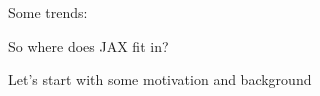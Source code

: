 \documentclass[
    xcolor={svgnames,dvipsnames},
    hyperref={colorlinks, citecolor=DeepPink4, linkcolor=DarkRed, urlcolor=DarkBlue}
    ]{beamer}  %
\newcommand{\1}{\mathbbm 1}
\begin{document}
\begin{frame}

    Some trends: 

    \begin{figure}
       \begin{center}
       \end{center}
    \end{figure}

\end{frame}



\begin{frame}
    
    So where does JAX fit in?

        \vspace{0.5em}
        \vspace{0.5em}
        \vspace{0.5em}
        \vspace{0.5em}
        \vspace{0.5em}
    Let's start with some motivation and background

\end{frame}
\end{document}
